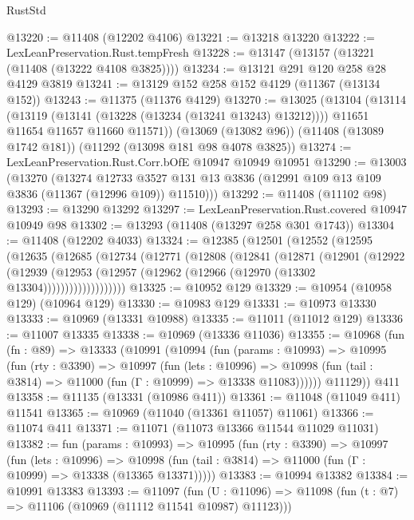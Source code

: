 \begin{lexlean}{RustStd}
\begin{coremodule}
@13220 := @11408 (@12202 @4106)
@13221 := @13218 @13220
@13222 := LexLeanPreservation.Rust.tempFresh
@13228 := @13147 (@13157 (@13221 (@11408 (@13222 @4108 @3825))))
@13234 := @13121 @291 @120 @258 @28 @4129 @3819
@13241 := @13129 @152 @258 @152 @4129 (@11367 (@13134 @152))
@13243 := @11375 (@11376 @4129)
@13270 := @13025
    (@13104
      (@13114
        (@13119 (@13141 (@13228 (@13234 (@13241 @13243) @13212))))
        @11651
        @11654
        @11657
        @11660
        @11571))
    (@13069 (@13082 @96))
    (@11408 (@13089 @1742 @181))
    (@11292 (@13098 @181 @98 @4078 @3825))
@13274 := LexLeanPreservation.Rust.Corr.bOfE @10947 @10949 @10951
@13290 := @13003
    (@13270
      (@13274
        @12733
        @3527
        @131
        @13
        @3836
        (@12991 @109 @13 @109 @3836 (@11367 (@12996 @109)) @11510)))
@13292 := @11408 (@11102 @98)
@13293 := @13290 @13292
@13297 := LexLeanPreservation.Rust.covered @10947 @10949 @98
@13302 := @13293 (@11408 (@13297 @258 @301 @1743))
@13304 := @11408 (@12202 @4033)
@13324 := @12385
    (@12501
      (@12552
        (@12595
          (@12635
            (@12685
              (@12734
                (@12771
                  (@12808
                    (@12841
                      (@12871
                        (@12901
                          (@12922
                            (@12939
                              (@12953
                                (@12957 (@12962 (@12966 (@12970 (@13302 @13304)))))))))))))))))))
@13325 := @10952 @129
@13329 := @10954 (@10958 @129) (@10964 @129)
@13330 := @10983 @129
@13331 := @10973 @13330
@13333 := @10969 (@13331 @10988)
@13335 := @11011 (@11012 @129)
@13336 := @11007 @13335
@13338 := @10969 (@13336 @11036)
@13355 := @10968
    (fun (fn : @89) =>
    @13333
      (@10991
        (@10994
          (fun (params : @10993) =>
          @10995
            (fun (rty : @3390) =>
            @10997
              (fun (lets : @10996) =>
              @10998 (fun (tail : @3814) => @11000 (fun (Γ : @10999) => @13338 @11083))))))
        @11129))
    @411
@13358 := @11135 (@13331 (@10986 @411))
@13361 := @11048 (@11049 @411) @11541
@13365 := @10969 (@11040 (@13361 @11057) @11061)
@13366 := @11074 @411
@13371 := @11071 (@11073 @13366 @11544 @11029 @11031)
@13382 := fun (params : @10993) =>
  @10995
    (fun (rty : @3390) =>
    @10997
      (fun (lets : @10996) =>
      @10998 (fun (tail : @3814) => @11000 (fun (Γ : @10999) => @13338 (@13365 @13371)))))
@13383 := @10994 @13382
@13384 := @10991 @13383
@13393 := @11097
    (fun (U : @11096) => @11098 (fun (t : @7) => @11106 (@10969 (@11112 @11541 @10987) @11123)))

\end{coremodule}
\end{lexlean}
